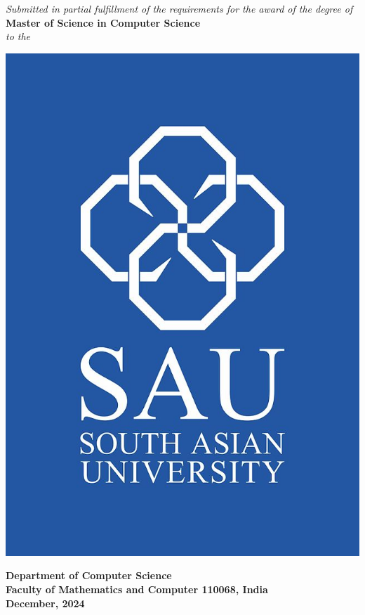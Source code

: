 \documentclass[12pt,a4paper,oneside,english]{report}
\begin{document}
\begin{center}
	\textit{Submitted in partial fulfillment of the requirements for the award of the degree of}\\
	\textbf{\large  Master of Science in Computer Science}\\
	\vspace{0.6cm}
	\textit{to the}
	\vspace{0.6cm}
	\begin{center}
		\includegraphics[scale=0.55]{Figures/SAULOGO.jpg}
	\end{center}
	\vspace*{0.8cm}
	\large \textbf{     {Department of Computer Science \\}\vspace{-.2cm}
		{ Faculty of Mathematics and Computer 110068, India\\}\vspace{-.2cm}
		{ December, 2024}
	}
	\vspace*{0.3cm}   
	\vfill
\end{center}
\end{document}
